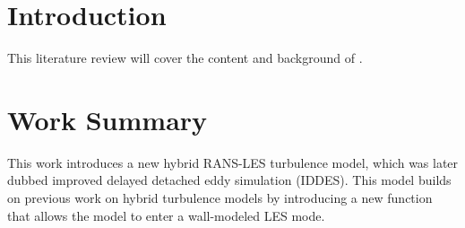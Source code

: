 \documentclass{ucb}
\begin{document}
\ucbcover{}

\section{Introduction}
This literature review will cover the content and background of \cite{shurHybridRANSLESApproach2008}. 

\section{Work Summary}
This work introduces a new hybrid RANS-LES turbulence model, which was later dubbed improved delayed detached eddy simulation (IDDES). This model builds on previous work on hybrid turbulence models by introducing a new function that allows the model to enter a wall-modeled LES mode.

\ucbbib{}
    
\end{document}
